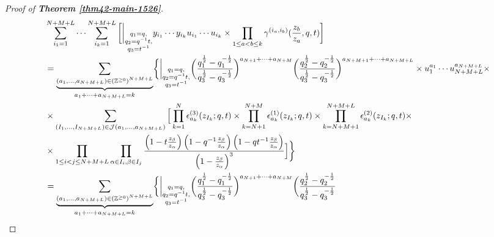 \documentclass[12pt,reqno,a4paper]{amsart}
\newcommand{\cals}[1]{\mathcal{#1}}
\newcommand{\bb}[1]{\mathbb{#1}}
\numberwithin{equation}{section}
\theoremstyle{definition}
\begin{document}
\begin{proof}[Proof of \textbf{Theorem \ref{thm42-main-1526}}]
\footnotesize
\begin{align}
	&\sum_{i_1 = 1}^{N+M+L}
	\cdots
	\sum_{i_k = 1}^{N+M+L}
	\bigg[
	\bigg|_{
		\substack{
			q_1 = q, \\
			q_2 = q^{-1}t,\\
			q_3 = t^{-1} \\
		}
	}
	y_{i_1}\cdots y_{i_k}
	u_{i_1}\cdots u_{i_k}
	\times
	\prod_{1 \leq a < b \leq k}
	\gamma^{(i_a,i_b)}(\frac{z_b}{z_a},q,t)
	\bigg]
	\label{eqn48-1544-5aug}
	\\
	&= 
	\underbrace{				
		\sum_{
			(a_1,\dots,a_{N+M+L}) \in 
			\left(
			\bb{Z}^{\geq 0}
			\right)^{N+M+L}
		}
	}_{
		a_1 + \dots + a_{N+M+L} = k 
	}
	\biggl\{
	\bigg|_{
		\substack{
			q_1 = q, \\
			q_2 = q^{-1}t,\\
			q_3 = t^{-1} \\
		}
	}
	\bigg(
	\frac{q_1^{\frac{1}{2}} - q_1^{-\frac{1}{2}}}{
		q_3^{\frac{1}{2}} - q_3^{-\frac{1}{2}}
	}
	\bigg)^{a_{N+1} + \cdots + a_{N+M}}
	\bigg(
	\frac{q_2^{\frac{1}{2}} - q_2^{-\frac{1}{2}}}{
		q_3^{\frac{1}{2}} - q_3^{-\frac{1}{2}}
	}
	\bigg)^{a_{N+M+1} + \cdots + a_{N+M+L}}
	\times
	u_1^{a_1}\cdots u_{N+M+L}^{a_{N+M+L}}
	\times 
	\notag 
	\\
	&\times
	\sum_{
		(I_1,\dots,I_{N+M+L}) \in 
		\cals{J}(a_1,\dots,a_{N+M+L})
	}
	\Big[
	\prod_{k = 1}^{N}\epsilon^{(3)}_{a_k}(z_{I_k} ; q,t)
	\times
	\prod_{k = N + 1}^{N + M}\epsilon^{(1)}_{a_k}(z_{I_k} ; q,t)
	\times
	\prod_{k = N+M+1}^{N+M+L}\epsilon^{(2)}_{a_k}(z_{I_k} ; q,t)
	\times 
	\notag 
	\\
	&\times 
	\prod_{1 \leq i < j \leq N+M+L}
	\prod_{\alpha \in I_i, \beta \in I_j}
	\frac{
		\left(1 - t	\frac{z_\beta}{z_\alpha}		\right)
		\left(1 - q^{-1}		\frac{z_\beta}{z_\alpha}					\right)
		\left(1 - qt^{-1}			\frac{z_\beta}{z_\alpha}				\right)
	}{
		\left(1 - 	\frac{z_\beta}{z_\alpha}				\right)^3
	}
	\Big]
	\biggr\}
	\notag 
	\\
	&= 
	\underbrace{				
		\sum_{
			(a_1,\dots,a_{N+M+L}) \in 
			\left(
			\bb{Z}^{\geq 0}
			\right)^{N+M+L}
		}
	}_{
		a_1 + \dots + a_{N+M+L} = k 
	}
	\biggl\{
	\bigg|_{
		\substack{
			q_1 = q, \\
			q_2 = q^{-1}t,\\
			q_3 = t^{-1} \\
		}
	}
	\bigg(
	\frac{q_1^{\frac{1}{2}} - q_1^{-\frac{1}{2}}}{
		q_3^{\frac{1}{2}} - q_3^{-\frac{1}{2}}
	}
	\bigg)^{a_{N+1} + \cdots + a_{N+M}}
	\bigg(
	\frac{q_2^{\frac{1}{2}} - q_2^{-\frac{1}{2}}}{
		q_3^{\frac{1}{2}} - q_3^{-\frac{1}{2}}
}
\end{align}
\end{proof}
\end{document}
